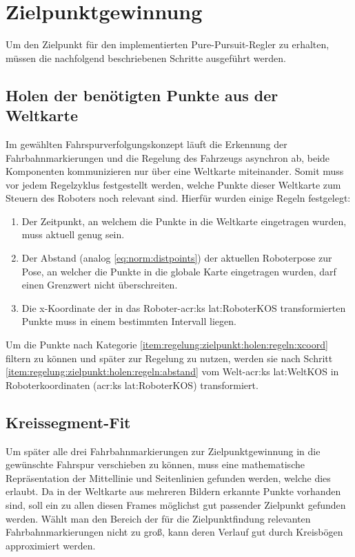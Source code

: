 \section{Zielpunktgewinnung}
Um den Zielpunkt für den implementierten \glqq Pure-Pursuit\grqq -Regler zu erhalten, müssen die nachfolgend beschriebenen Schritte ausgeführt werden.

\subsection{Holen der benötigten Punkte aus der Weltkarte}
Im gewählten Fahrspurverfolgungskonzept läuft die Erkennung der Fahrbahnmarkierungen und die Regelung des Fahrzeugs asynchron ab, beide Komponenten kommunizieren nur über eine Weltkarte miteinander. Somit muss vor jedem Regelzyklus festgestellt werden, welche Punkte dieser Weltkarte zum Steuern des Roboters noch relevant sind. Hierfür wurden einige Regeln festgelegt:
\begin{enumerate}
\item
Der Zeitpunkt, an welchem die Punkte in die Weltkarte eingetragen wurden, muss aktuell genug sein.
\item \label{item:regelung:zielpunkt:holen:regeln:abstand}
Der Abstand (analog \ref{eq:norm:distpoints}) der aktuellen Roboterpose zur Pose, an welcher die Punkte in die globale Karte eingetragen wurden, darf einen Grenzwert nicht überschreiten.
\item \label{item:regelung:zielpunkt:holen:regeln:xcoord}
Die x-Koordinate der in das Roboter-\gls{acr:ks} \gls{lat:RoboterKOS} transformierten Punkte muss in einem bestimmten Intervall liegen.
\end{enumerate}
Um die Punkte nach Kategorie \ref{item:regelung:zielpunkt:holen:regeln:xcoord} filtern zu können und später zur Regelung zu nutzen, werden sie nach Schritt \ref{item:regelung:zielpunkt:holen:regeln:abstand} vom Welt-\gls{acr:ks} \gls{lat:WeltKOS} in Roboterkoordinaten (\gls{acr:ks} \gls{lat:RoboterKOS}) transformiert.

\subsection{Kreissegment-Fit} \label{regelung:zielpunkt:kreissegment-fit}
Um später alle drei Fahrbahnmarkierungen zur Zielpunktgewinnung in die gewünschte Fahrspur verschieben zu können, muss eine mathematische Repräsentation der Mittellinie und Seitenlinien gefunden werden, welche dies erlaubt. Da in der Weltkarte aus mehreren Bildern erkannte Punkte vorhanden sind, soll ein zu allen diesen Frames möglichst gut passender Zielpunkt gefunden werden. Wählt man den Bereich der für die Zielpunktfindung relevanten Fahrbahnmarkierungen nicht zu groß, kann deren Verlauf gut durch Kreisbögen approximiert werden. 

